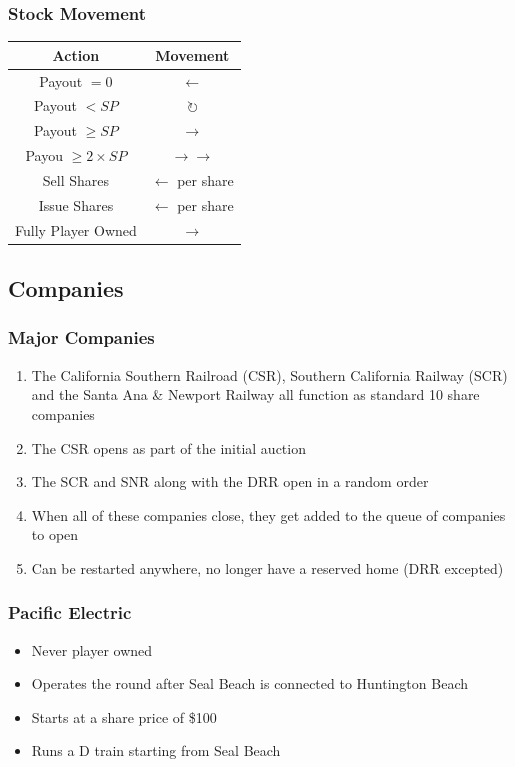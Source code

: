 \documentclass[letterpaper]{article}
\begin{document}
\begin{multicols}{2}
  \subsubsection*{Stock Movement}
  \begin{tabular}{c|c}
    \hline
    \textbf{Action} & \textbf{Movement} \\
    \hline
    \hline
    Payout $= 0$ & $\leftarrow$ \\
    Payout $< SP$ & $\circlearrowright$ \\
    Payout $\geq SP$ & $\rightarrow$ \\
    Payou $\geq 2 \times SP$ & $\rightarrow\rightarrow$ \\
    \hline
    Sell Shares & $\leftarrow$ per share \\
    Issue Shares & $\leftarrow$ per share \\
    Fully Player Owned & $\rightarrow$ \\
    \hline
  \end{tabular}

  \subsection*{Companies}

  \subsubsection*{Major Companies}
  \begin{enumerate}
  \item The California Southern Railroad (CSR), Southern California Railway (SCR)
    and the Santa Ana \& Newport Railway all function as standard 10 share
    companies
  \item The CSR opens as part of the initial auction
  \item The SCR and SNR along with the DRR open in a random order
  \item When all of these companies close, they get added to the queue of companies to open
  \item Can be restarted anywhere, no longer have a reserved home (DRR excepted)
  \end{enumerate}

  \subsubsection*{Pacific Electric}
  \begin{itemize}
  \item Never player owned
  \item Operates the round after Seal Beach is connected to Huntington Beach
  \item Starts at a share price of \$100
  \item Runs a D train starting from Seal Beach
  \end{itemize}

\end{multicols}
\end{document}
